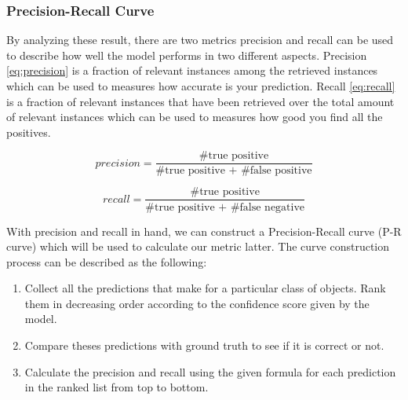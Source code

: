\subsubsection{Precision-Recall Curve}
\label{sec:Eval-pr-curve}

By analyzing these result, there are two metrics precision and recall can be
used to describe how well the model performs in two different aspects.
Precision \autoref{eq:precision} is a fraction of relevant instances among the
retrieved instances which can be used to measures how accurate is your
prediction.
Recall \autoref{eq:recall} is a fraction of relevant instances that have been
retrieved over the total amount of relevant instances which can be used to
measures how good you find all the positives.

\begin{equation}
\label{eq:precision}
\mathit{precision} =
\frac
{\text{\# true positive}}
{\text{\# true positive + \# false positive}}
\end{equation}

\begin{equation}
\label{eq:recall}
\mathit{recall} =
\frac
{\text{\# true positive}}
{\text{\# true positive + \# false negative}}
\end{equation}


With precision and recall in hand, we can construct a Precision-Recall curve
(P-R curve) which will be used to calculate our metric latter. The curve
construction process can be described as the following:

\begin{enumerate}
    \item Collect all the predictions that make for a particular class of
    objects. Rank them in decreasing order according to the confidence score
    given by the model.
    \item  Compare theses predictions with ground truth to see if it is correct
    or not.
    \item Calculate the precision and recall using the given formula for each
    prediction in the ranked list from top to bottom.
\end{enumerate}

